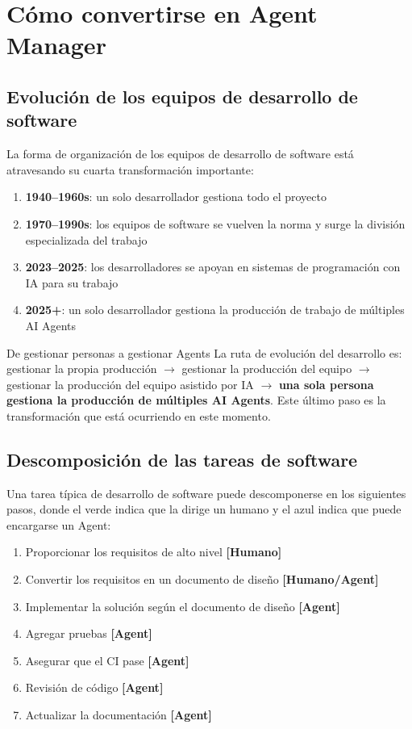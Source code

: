 \section{Cómo convertirse en Agent Manager}

\subsection{Evolución de los equipos de desarrollo de software}

La forma de organización de los equipos de desarrollo de software está atravesando su cuarta transformación importante:

\begin{enumerate}
    \item \textbf{1940--1960s}: un solo desarrollador gestiona todo el proyecto
    \item \textbf{1970--1990s}: los equipos de software se vuelven la norma y surge la división especializada del trabajo
    \item \textbf{2023--2025}: los desarrolladores se apoyan en sistemas de programación con IA para su trabajo
    \item \textbf{2025+}: un solo desarrollador gestiona la producción de trabajo de múltiples AI Agents
\end{enumerate}

\begin{importantbox}{De gestionar personas a gestionar Agents}
La ruta de evolución del desarrollo es: gestionar la propia producción $\rightarrow$ gestionar la producción del equipo $\rightarrow$ gestionar la producción del equipo asistido por IA $\rightarrow$ \textbf{una sola persona gestiona la producción de múltiples AI Agents}. Este último paso es la transformación que está ocurriendo en este momento.
\end{importantbox}

\subsection{Descomposición de las tareas de software}

Una tarea típica de desarrollo de software puede descomponerse en los siguientes pasos, donde el verde indica que la dirige un humano y el azul indica que puede encargarse un Agent:

\begin{enumerate}
    \item Proporcionar los requisitos de alto nivel \textbf{{[}Humano{]}}
    \item Convertir los requisitos en un documento de diseño \textbf{{[}Humano/Agent{]}}
    \item Implementar la solución según el documento de diseño \textbf{{[}Agent{]}}
    \item Agregar pruebas \textbf{{[}Agent{]}}
    \item Asegurar que el CI pase \textbf{{[}Agent{]}}
    \item Revisión de código \textbf{{[}Agent{]}}
    \item Actualizar la documentación \textbf{{[}Agent{]}}
\end{enumerate}

